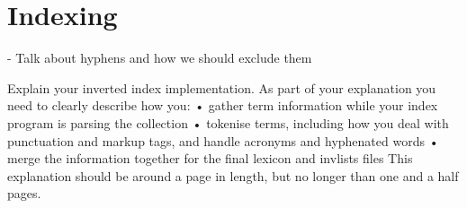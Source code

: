 
\section{Indexing}
\label{sec:indexing}

- Talk about hyphens and how we should exclude them


Explain your inverted index implementation. As part of your explanation you need to clearly describe how you:
• gather term information while your index program is parsing the collection
• tokenise terms, including how you deal with punctuation and markup tags, and
handle acronyms and hyphenated words
• merge the information together for the final lexicon and invlists files
This explanation should be around a page in length, but no longer than one and a half pages.


